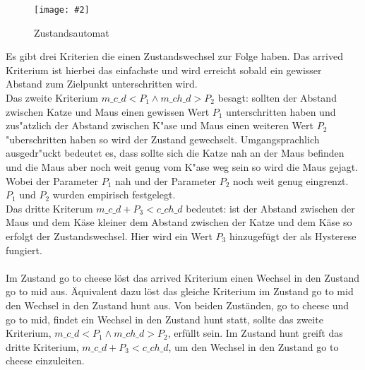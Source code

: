 \documentclass[
a4paper,     %
12pt         %
]{scrartcl}  %
\newcommand{\mygraphics}[3]{
\begin{figure}[!h]
  \begin{center}
    \texttt{[image: \#2]} \\    
    \caption{#3}\label{fig:#2}
  \end{center}
\end{figure}

}
\begin{document}
\mygraphics{0.7\textwidth}{stateMachine.png}{Zustandsautomat}
Es gibt drei Kriterien die einen Zustandswechsel zur Folge haben. Das \glqq arrived\grqq{} Kriterium ist hierbei das einfachste und wird erreicht sobald ein gewisser Abstand zum Zielpunkt unterschritten wird.\\
Das zweite Kriterium \glqq$m\_c\_d < P_{1} \land  m\_ch\_d > P_{2} $\grqq{} besagt: sollten der Abstand zwischen Katze und Maus einen gewissen Wert $P_{1}$ unterschritten haben und zus"atzlich der Abstand zwischen K"ase und Maus einen weiteren Wert $P_{2}$ "uberschritten haben so wird der Zustand gewechselt. Umgangsprachlich ausgedr"uckt bedeutet es, dass sollte sich die Katze nah an der Maus befinden und die Maus aber noch weit genug vom K"ase weg sein so wird die Maus gejagt. Wobei der Parameter $P_{1}$ \glqq nah \grqq{} und der Parameter $P_{2}$ \glqq noch weit genug\grqq{} eingrenzt. $P_{1}$ und $P_{2}$ wurden empirisch festgelegt.\\
Das dritte Kriterum \glqq $m\_c\_d + P_{3} < c\_ch\_d$\grqq{} bedeutet: ist der Abstand zwischen der Maus und dem Käse kleiner dem Abstand zwischen der Katze und dem Käse so erfolgt der Zustandswechsel. Hier wird ein Wert $P_{3}$ hinzugefügt der als Hysterese fungiert.
\\\\Im Zustand \glqq go to cheese\grqq{} löst das \glqq arrived\grqq{} Kriterium einen Wechsel in den Zustand \glqq go to mid\grqq{}
aus. Äquivalent dazu löst das gleiche Kriterium im Zustand \glqq go to mid\grqq{} den Wechsel in den Zustand \glqq hunt\grqq{} aus.
Von beiden Zuständen, \glqq go to cheese\grqq{} und \glqq go to mid\grqq{}, findet ein Wechsel in den Zustand \glqq hunt\grqq{} statt, sollte das zweite Kriterium, \glqq$m\_c\_d < P_{1} \land  m\_ch\_d > P_{2} $\grqq{}, erfüllt sein. Im Zustand \glqq hunt\grqq{} greift das dritte Kriterium, \glqq $m\_c\_d + P_{3} < c\_ch\_d$\grqq{}, um den Wechsel in den Zustand \glqq go to cheese\grqq{} einzuleiten.
\end{document}
